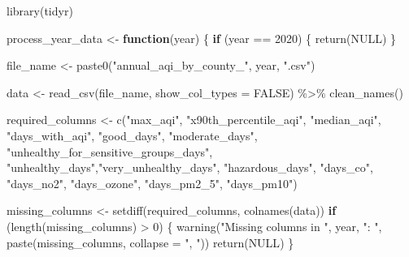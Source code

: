 \documentclass[
  12pt,
]{article}
\newenvironment{Shaded}{\begin{snugshade}}{\end{snugshade}}
\newcommand{\AttributeTok}[1]{\textcolor[rgb]{0.40,0.45,0.13}{#1}}
\newcommand{\ConstantTok}[1]{\textcolor[rgb]{0.56,0.35,0.01}{#1}}
\newcommand{\ControlFlowTok}[1]{\textcolor[rgb]{0.00,0.23,0.31}{\textbf{#1}}}
\newcommand{\DecValTok}[1]{\textcolor[rgb]{0.68,0.00,0.00}{#1}}
\newcommand{\FunctionTok}[1]{\textcolor[rgb]{0.28,0.35,0.67}{#1}}
\newcommand{\NormalTok}[1]{\textcolor[rgb]{0.00,0.23,0.31}{#1}}
\newcommand{\OtherTok}[1]{\textcolor[rgb]{0.00,0.23,0.31}{#1}}
\newcommand{\SpecialCharTok}[1]{\textcolor[rgb]{0.37,0.37,0.37}{#1}}
\newcommand{\StringTok}[1]{\textcolor[rgb]{0.13,0.47,0.30}{#1}}
\begin{document}
\begin{Shaded}
\begin{Highlighting}[]
\FunctionTok{library}\NormalTok{(tidyr)}


\NormalTok{process\_year\_data }\OtherTok{\textless{}{-}} \ControlFlowTok{function}\NormalTok{(year) \{}
  \ControlFlowTok{if}\NormalTok{ (year }\SpecialCharTok{==} \DecValTok{2020}\NormalTok{) \{}
    \FunctionTok{return}\NormalTok{(}\ConstantTok{NULL}\NormalTok{)  }
\NormalTok{  \}}
  
  
\NormalTok{  file\_name }\OtherTok{\textless{}{-}} \FunctionTok{paste0}\NormalTok{(}\StringTok{"annual\_aqi\_by\_county\_"}\NormalTok{, year, }\StringTok{".csv"}\NormalTok{)}
  
  
\NormalTok{  data }\OtherTok{\textless{}{-}} \FunctionTok{read\_csv}\NormalTok{(file\_name, }\AttributeTok{show\_col\_types =} \ConstantTok{FALSE}\NormalTok{) }\SpecialCharTok{\%\textgreater{}\%}
    \FunctionTok{clean\_names}\NormalTok{()}
  
  
\NormalTok{  required\_columns }\OtherTok{\textless{}{-}} \FunctionTok{c}\NormalTok{(}\StringTok{"max\_aqi"}\NormalTok{, }\StringTok{"x90th\_percentile\_aqi"}\NormalTok{, }\StringTok{"median\_aqi"}\NormalTok{,}
                        \StringTok{"days\_with\_aqi"}\NormalTok{, }\StringTok{"good\_days"}\NormalTok{, }
                        \StringTok{"moderate\_days"}\NormalTok{,}
                        \StringTok{"unhealthy\_for\_sensitive\_groups\_days"}\NormalTok{,}
                        \StringTok{"unhealthy\_days"}\NormalTok{,}\StringTok{"very\_unhealthy\_days"}\NormalTok{,}
                        \StringTok{"hazardous\_days"}\NormalTok{,}
                        \StringTok{"days\_co"}\NormalTok{, }\StringTok{"days\_no2"}\NormalTok{, }\StringTok{"days\_ozone"}\NormalTok{, }
                        \StringTok{"days\_pm2\_5"}\NormalTok{, }\StringTok{"days\_pm10"}\NormalTok{)}
  
  
\NormalTok{  missing\_columns }\OtherTok{\textless{}{-}} \FunctionTok{setdiff}\NormalTok{(required\_columns, }\FunctionTok{colnames}\NormalTok{(data))}
  \ControlFlowTok{if}\NormalTok{ (}\FunctionTok{length}\NormalTok{(missing\_columns) }\SpecialCharTok{\textgreater{}} \DecValTok{0}\NormalTok{) \{}
    \FunctionTok{warning}\NormalTok{(}\StringTok{"Missing columns in "}\NormalTok{, year, }\StringTok{": "}\NormalTok{, }
            \FunctionTok{paste}\NormalTok{(missing\_columns, }\AttributeTok{collapse =} \StringTok{", "}\NormalTok{))}
    \FunctionTok{return}\NormalTok{(}\ConstantTok{NULL}\NormalTok{)  }
\NormalTok{  \}}
  

\end{Highlighting}
\end{Shaded}
\end{document}
